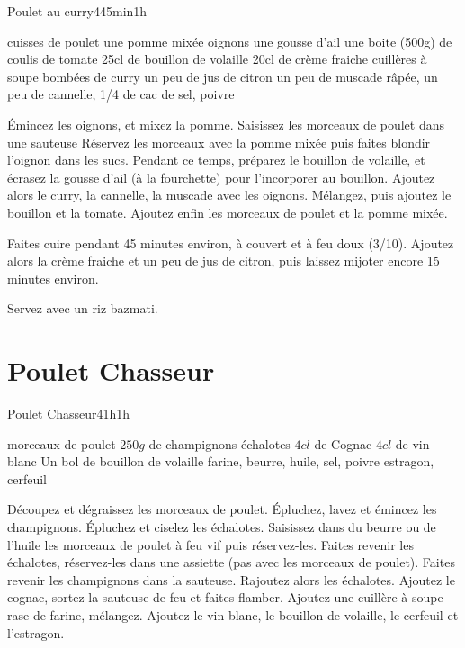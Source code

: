 {\begin{recette}{Poulet au curry}{4}{45min}{1h}
\begin{ingredients}
 cuisses de poulet
\ingredient une pomme mixée
 oignons
\ingredient une gousse d'ail
\ingredient une boite (500g) de coulis de tomate
\ingredient 25cl de bouillon de volaille
\ingredient 20cl de crème fraiche
 cuillères à soupe bombées de curry
\ingredient un peu de jus de citron
\ingredient un peu de muscade râpée, un peu de cannelle, 1/4 de cac de sel, poivre
\end{ingredients}

\begin{preparation}
\etape Émincez les oignons, et mixez la pomme.
\etape Saisissez les morceaux de poulet dans une sauteuse
\etape Réservez les morceaux avec la pomme mixée puis faites blondir l'oignon dans les sucs.
\etape Pendant ce temps, préparez le bouillon de volaille, et écrasez la gousse d'ail (à la fourchette) pour l'incorporer au 
bouillon.
\etape Ajoutez alors le curry, la cannelle, la muscade avec les oignons. Mélangez, puis ajoutez le bouillon et la tomate. Ajoutez enfin les morceaux de poulet et la pomme mixée.
\end{preparation}

\begin{cuisson}
Faites cuire pendant 45 minutes environ, à couvert et à feu doux (3/10). Ajoutez alors la crème fraiche et un peu de jus 
de citron, puis laissez mijoter encore 15 minutes environ. 

Servez avec un riz bazmati.
\end{cuisson}
\end{recette}


\section{Poulet Chasseur}
\begin{recette}{Poulet Chasseur}{4}{1h}{1h}
\begin{ingredients}
 morceaux de poulet
\ingredient $250\unit{g}$ de champignons
 échalotes
\ingredient $4\unit{cl}$ de Cognac
\ingredient $4\unit{cl}$ de vin blanc
\ingredient Un bol de bouillon de volaille
\ingredient farine, beurre, huile, sel, poivre
\ingredient estragon, cerfeuil
\end{ingredients}


\begin{preparation}
\etape Découpez et dégraissez les morceaux de poulet. 
\etape Épluchez, lavez et émincez les champignons. Épluchez et ciselez les échalotes.
\etape Saisissez dans du beurre ou de l'huile les morceaux de poulet à feu vif puis réservez-les.
\etape Faites revenir les échalotes, réservez-les dans une assiette (pas avec les morceaux de poulet).
\etape Faites revenir les champignons dans la sauteuse. 
\etape Rajoutez alors les échalotes. Ajoutez le cognac, sortez la sauteuse de feu et faites flamber. 
\etape Ajoutez une cuillère à soupe rase de farine, mélangez.
\etape Ajoutez le vin blanc, le bouillon de volaille, le cerfeuil et l'estragon. 
\end{preparation}


\end{recette}}

